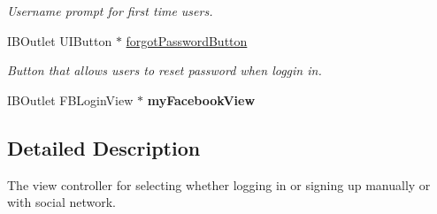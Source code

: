 \begin{DoxyCompactItemize}
\begin{DoxyCompactList}\small\item\em Username prompt for first time users. \end{DoxyCompactList}\item 
\hypertarget{interface_login_sign_up_ad834f5c1778788ef1e52a3f293428e0e}{I\+B\+Outlet U\+I\+Button $\ast$ \hyperlink{interface_login_sign_up_ad834f5c1778788ef1e52a3f293428e0e}{forgot\+Password\+Button}}\label{interface_login_sign_up_ad834f5c1778788ef1e52a3f293428e0e}

\begin{DoxyCompactList}\small\item\em Button that allows users to reset password when loggin in. \end{DoxyCompactList}\item 
\hypertarget{interface_login_sign_up_a9e4cd20e79e68eb78100e9d34fbeaac3}{I\+B\+Outlet F\+B\+Login\+View $\ast$ {\bfseries my\+Facebook\+View}}\label{interface_login_sign_up_a9e4cd20e79e68eb78100e9d34fbeaac3}

\end{DoxyCompactItemize}


\subsection{Detailed Description}
The view controller for selecting whether logging in or signing up manually or with social network. 

